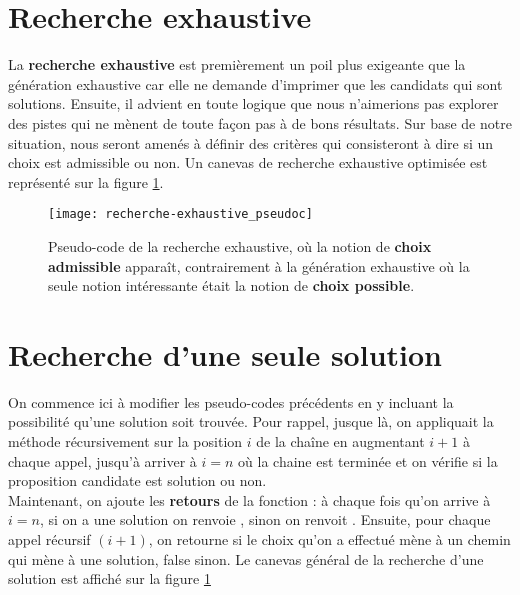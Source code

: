 \documentclass[12pt,a4paper]{book}
\newcommand{\pseudo}[1]{\rouge{\textsc{#1}}}
\begin{document}
\section{Recherche exhaustive}
La \textbf{recherche exhaustive} est premièrement un poil plus exigeante que la génération exhaustive car elle ne demande d'imprimer que les candidats qui sont solutions. Ensuite, il advient en toute logique que nous n'aimerions pas explorer des pistes qui ne mènent de toute façon pas à de bons résultats. Sur base de notre situation, nous seront amenés à définir des critères qui consisteront à dire si un choix est admissible ou non. Un canevas de recherche exhaustive optimisée est représenté sur la figure \ref{fig:recherche-exhaustive_pseudoc}.
\begin{figure}[h]
\centering
\texttt{[image: recherche-exhaustive\_pseudoc]}
\caption{Pseudo-code de la recherche exhaustive, où la notion de \textbf{choix admissible} apparaît, contrairement à la génération exhaustive où la seule notion intéressante était la notion de \textbf{choix possible}.}
\label{fig:recherche-exhaustive_pseudoc}
\end{figure}


\section{Recherche d'une seule solution}
On commence ici à modifier les pseudo-codes précédents en y incluant la possibilité qu'une solution soit trouvée. Pour rappel, jusque là, on appliquait la méthode \pseudo{Test} récursivement sur la position $i$ de la chaîne en augmentant $i+1$ à chaque appel, jusqu'à arriver à $i=n$ où la chaine est terminée et on vérifie si la proposition candidate est solution ou non. \\

Maintenant, on ajoute les \textbf{retours} de la fonction : à chaque fois qu'on arrive à $i=n$, si on a une solution on renvoie , sinon on renvoit . Ensuite, pour chaque appel récursif \pseudo{Test}$(i+1)$, on retourne  si le choix qu'on a effectué mène à un chemin qui mène à une solution, false sinon. Le canevas général de la recherche d'une solution est affiché sur la figure  \ref{fig:recherche-exhaustive_pseudoc}
\end{document}
